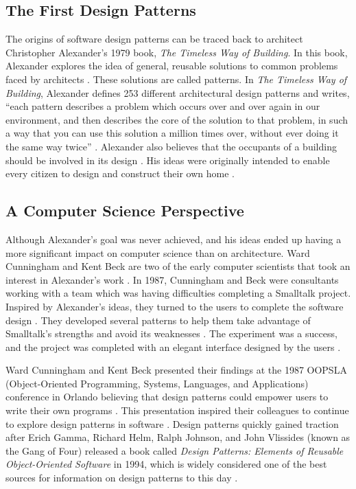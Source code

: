 \documentclass[11pt]{article}
\begin{document}
\subsection{The First Design Patterns}

The origins of software design patterns can be traced back to architect Christopher Alexander's 1979 book, \textit{The Timeless Way of Building}. In this book, Alexander explores the idea of general, reusable solutions to common problems faced by architects  \cite{alexander1979}. These solutions are called patterns. In \textit{The Timeless Way of Building}, Alexander defines 253 different architectural design patterns and writes, ``each pattern describes a problem which occurs over and over again in our environment, and then describes the core of the solution to that problem, in such a way that you can use this solution a million times over, without ever doing it the same way twice'' \cite{alexander1979}. Alexander also believes that the occupants of a building should be involved in its design \cite{alexander1979}. His ideas were originally intended to enable every citizen to design and construct their own home \cite{alexander1979}. 

\subsection{A Computer Science Perspective}

Although Alexander's goal was never achieved, and his ideas ended up having a more significant impact on computer science than on architecture. Ward Cunningham and Kent Beck are two of the early computer scientists that took an interest in Alexander's work \cite{cunningham2011}. In 1987, Cunningham and Beck were consultants working with a team which was having difficulties completing a Smalltalk project. Inspired by Alexander's ideas, they turned to the users to complete the software design \cite{beck1987}. They developed several patterns to help them take advantage of Smalltalk's strengths and avoid its weaknesses \cite{beck1987}. The experiment was a success, and the project was completed with an elegant interface designed by the users \cite{beck1987}.

Ward Cunningham and Kent Beck presented their findings at the 1987 OOPSLA (Object-Oriented Programming, Systems, Languages, and Applications) conference in Orlando believing that design patterns could empower users to write their own programs \cite{beck1987}. This presentation inspired their colleagues to continue to explore design patterns in software \cite{arnold1999}. Design patterns quickly gained traction after Erich Gamma, Richard Helm, Ralph Johnson, and John Vlissides (known as the Gang of Four) released a book called \textit{Design Patterns: Elements of Reusable Object-Oriented Software} in 1994, which is widely considered one of the best sources for information on design patterns to this day \cite{clarke2016}.
\end{document}
